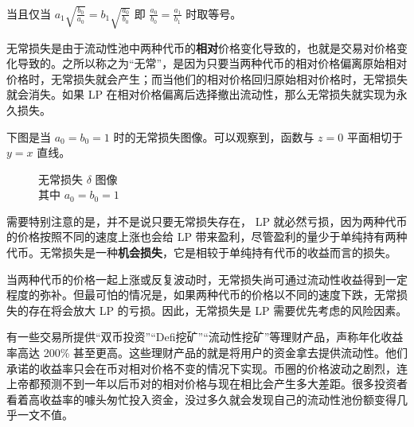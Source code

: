 \documentclass[12pt, a4paper, oneside]{ctexart}
\begin{document}
\noindent 当且仅当 $\displaystyle a_1\sqrt{\frac{b_0}{a_0}} = b_1\sqrt{\frac{a_0}{b_0}}$ 即 $\displaystyle \frac{a_0}{b_0} = \frac{a_1}{b_1}$ 时取等号。

无常损失是由于流动性池中两种代币的\textbf{相对}价格变化导致的，也就是交易对价格变化导致的。之所以称之为“无常”，是因为只要当两种代币的相对价格偏离原始相对价格时，无常损失就会产生；而当他们的相对价格回归原始相对价格时，无常损失就会消失。如果 LP 在相对价格偏离后选择撤出流动性，那么无常损失就实现为永久损失。

下图是当 $a_0=b_0=1$ 时的无常损失图像。可以观察到，函数与 $z=0$ 平面相切于 $y=x$ 直线。

\begin{figure}
    \centering
    \caption{无常损失 $\delta$ 图像 \\ 其中 $a_0=b_0=1$}
\end{figure}

需要特别注意的是，并不是说只要无常损失存在， LP 就必然亏损，因为两种代币的价格按照不同的速度上涨也会给 LP 带来盈利，尽管盈利的量少于单纯持有两种代币。无常损失是一种\textbf{机会损失}，它是相较于单纯持有代币的收益而言的损失。

当两种代币的价格一起上涨或反复波动时，无常损失尚可通过流动性收益得到一定程度的弥补。但最可怕的情况是，如果两种代币的价格以不同的速度下跌，无常损失的存在将会放大 LP 的亏损。因此，无常损失是 LP 需要优先考虑的风险因素。

有一些交易所提供“双币投资”“Defi挖矿”“流动性挖矿”等理财产品，声称年化收益率高达 200\% 甚至更高。这些理财产品的就是将用户的资金拿去提供流动性。他们承诺的收益率只会在币对相对价格不变的情况下实现。币圈的价格波动之剧烈，连上帝都预测不到一年以后币对的相对价格与现在相比会产生多大差距。很多投资者看着高收益率的噱头匆忙投入资金，没过多久就会发现自己的流动性池份额变得几乎一文不值。
\end{document}
